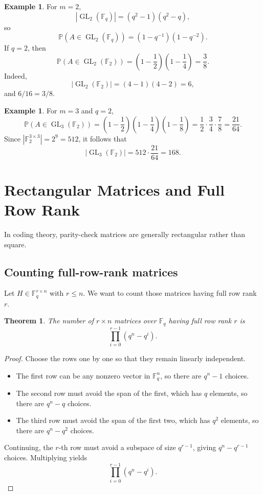 \documentclass[11pt]{article}
\newcommand{\F}{\mathbb{F}}
\newcommand{\GL}{\operatorname{GL}}
\newcommand{\Prob}{\mathbb{P}}
\theoremstyle{definition}
\newtheorem{example}[definition]{Example}
\theoremstyle{plain}
\newtheorem{theorem}[definition]{Theorem}
\begin{document}
	\begin{example}
		For \(m=2\),
		\[
		|\GL_2(\F_q)|=(q^2-1)(q^2-q),
		\]
		so
		\[
		\Prob(A\in \GL_2(\F_q))=(1-q^{-1})(1-q^{-2}).
		\]
		If \(q=2\), then
		\[
		\Prob(A\in \GL_2(\F_2))=\left(1-\frac12\right)\left(1-\frac14\right)=\frac38.
		\]
		Indeed,
		\[
		|\GL_2(\F_2)|=(4-1)(4-2)=6,
		\]
		and \(6/16=3/8\).
	\end{example}
	
	\begin{example}
		For \(m=3\) and \(q=2\),
		\[
		\Prob(A\in \GL_3(\F_2))
		=
		\left(1-\frac12\right)\left(1-\frac14\right)\left(1-\frac18\right)
		=
		\frac12\cdot\frac34\cdot\frac78
		=
		\frac{21}{64}.
		\]
		Since \(|\F_2^{3\times 3}|=2^9=512\), it follows that
		\[
		|\GL_3(\F_2)|=512\cdot \frac{21}{64}=168.
		\]
	\end{example}
	
	\section{Rectangular Matrices and Full Row Rank}
	
	In coding theory, parity-check matrices are generally rectangular rather than square.
	
	\subsection{Counting full-row-rank matrices}
	
	Let \(H\in \F_q^{r\times n}\) with \(r\le n\). We want to count those matrices having full row rank \(r\).
	
	\begin{theorem}
		The number of \(r\times n\) matrices over \(\F_q\) having full row rank \(r\) is
		\[
		\prod_{i=0}^{r-1}(q^n-q^i).
		\]
	\end{theorem}
	
	\begin{proof}
		Choose the rows one by one so that they remain linearly independent.
		
		\begin{itemize}[leftmargin=2em]
			\item The first row can be any nonzero vector in \(\F_q^n\), so there are \(q^n-1\) choices.
			\item The second row must avoid the span of the first, which has \(q\) elements, so there are \(q^n-q\) choices.
			\item The third row must avoid the span of the first two, which has \(q^2\) elements, so there are \(q^n-q^2\) choices.
		\end{itemize}
		
		Continuing, the \(r\)-th row must avoid a subspace of size \(q^{r-1}\), giving \(q^n-q^{r-1}\) choices. Multiplying yields
		\[
		\prod_{i=0}^{r-1}(q^n-q^i).
		\]
	\end{proof}
	
\end{document}
